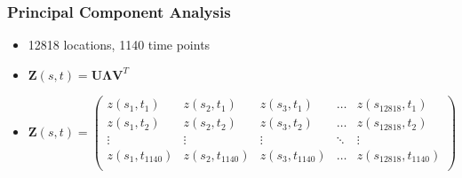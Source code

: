 \documentclass{beamer}
\begin{document}
\begin{frame}
\frametitle{Principal Component Analysis}
\begin{itemize}
	\item 12818 locations, 1140 time points
	\item $\mathbf{Z}(s,t) = \mathbf{U}\mathbf{\Lambda}\mathbf{V}^T$  
	\item $\mathbf{Z}(s,t)  = \begin{pmatrix}
	z(s_1, t_1) & z(s_2, t_1) & z(s_3, t_1) & \dots & z(s_{12818}, t_1) \\
	z(s_1, t_2) & z(s_2, t_2) & z(s_3, t_2) & \dots & z(s_{12818}, t_2) \\
	\vdots & \vdots & \vdots & \ddots & \vdots\\
	z(s_1, t_{1140}) & z(s_2, t_{1140}) & z(s_3, t_{1140}) & \dots & z(s_{12818}, t_{1140})\\ 
	\end{pmatrix}$
\end{itemize}
\end{frame}
\end{document}
